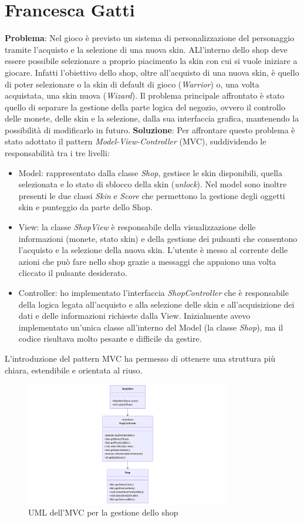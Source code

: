 \documentclass[a4paper,12pt]{report}
\begin{document}
\section{Francesca Gatti}
\textbf{Problema}: Nel gioco è previsto un sistema di personalizzazione del personaggio tramite l'acquisto e la selezione di una nuova skin.
ALl'interno dello shop deve essere possibile selezionare a proprio piacimento la skin con cui si vuole iniziare a giocare. Infatti l'obiettivo dello
shop, oltre all'acquisto di una nuova skin, è quello di poter selezionare o la skin di default di gioco (\emph{Warrior}) o, una volta acquistata, una skin 
nuova (\emph{Wizard}). 
Il problema principale affrontato è stato quello di separare la gestione della parte logica del negozio, ovvero il controllo delle monete, 
delle skin e la selezione, dalla sua interfaccia grafica, mantenendo la possibilità di modificarlo in futuro.
\textbf{Soluzione}: Per affrontare questo problema è stato adottato il pattern \emph{Model-View-Controller} (MVC), suddividendo le responsabilità 
tra i tre livelli:
\begin{itemize}
    \item Model: rappresentato dalla classe \emph{Shop}, gestisce le skin disponibili, quella selezionata e lo stato di sblocco della skin (\emph{unlock}). 
    Nel model sono inoltre presenti le due classi \emph{Skin} e \emph{Score} che permettono la gestione degli oggetti skin e punteggio da parte dello Shop.
    \item View: la classe \emph{ShopView} è responsabile della visualizzazione delle informazioni (monete, stato skin) e della gestione dei pulsanti 
    che consentono l'acquisto e la selezione della nuova skin. L'utente è messo al corrente delle azioni che può fare nello shop grazie a 
    messaggi che appaiono una volta cliccato il pulsante desiderato.
    \item Controller: ho implementato l'interfaccia \emph{ShopController} che è responsabile della logica legata all'acquisto e alla selezione 
    delle skin e all'acquisizione dei dati e delle informazioni richieste dalla View. Inizialmente avevo implementato un'unica classe 
    all'interno del Model (la classe \emph{Shop}), ma il codice risultava molto pesante e difficile da gestire.
\end{itemize}
L'introduzione del pattern MVC ha permesso di ottenere una struttura più chiara, estendibile e orientata al riuso.
\begin{figure}
    \centering
    \includegraphics[width=0.8\textwidth]{resources/UMLshop.png}
    \caption{UML dell'MVC per la gestione dello shop}
    \label{fig: 2.2}
\end{figure}
\end{document}
